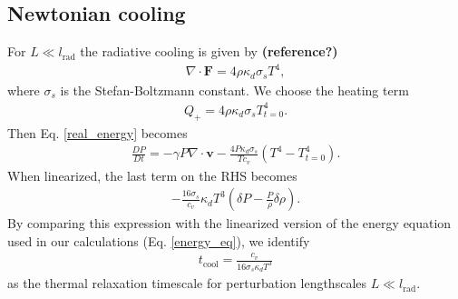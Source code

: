 \subsection{Newtonian cooling}\label{newton_cool}
For $L\ll l_\mathrm{rad}$ the radiative cooling is given by {\bf (reference?)}
\begin{align}
\nabla\cdot\bm{F} = 4 \rho \kappa_d \sigma_s T^4,
\end{align}   
where $\sigma_s$ is the Stefan-Boltzmann constant. We choose the
heating term 
\begin{align}
  Q_+ = 4\rho\kappa_d\sigma_s T^{4}_{t=0}. 
\end{align}
Then Eq. \ref{real_energy} becomes
\begin{align}
  \frac{DP}{Dt} = -\gamma P \nabla\cdot\bm{v} -
  \frac{4P\kappa_d\sigma_s}{Tc_v}\left(T^4 - T_{t=0}^4\right). 
\end{align}
When linearized, the last term on the RHS becomes
\begin{align}
  -\frac{16\sigma_s}{c_v}\kappa_d T^3\left(\delta P -
    \frac{P}{\rho}\delta\rho\right). 
\end{align}
By comparing this expression with the linearized version of the energy
equation used in our calculations (Eq. \ref{energy_eq}), we identify 
\begin{align}\label{tc_newton_cool} 
  t_\mathrm{cool} = \frac{c_v}{16\sigma_s\kappa_dT^3}
\end{align}
as the thermal relaxation timescale for perturbation lengthscales
$L\ll l_\mathrm{rad}$. 

